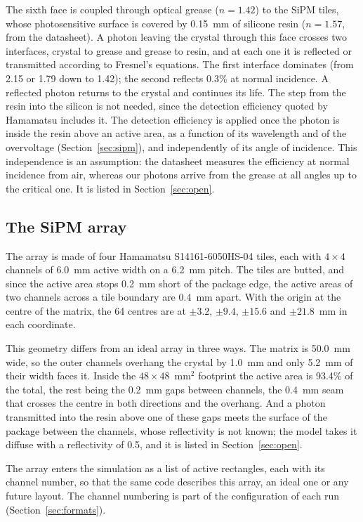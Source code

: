 \documentclass[11pt]{article}
\begin{document}
The sixth face is coupled through optical grease ($n = 1.42$) to the SiPM
tiles, whose photosensitive surface is covered by 0.15~mm of silicone resin
($n = 1.57$, from the datasheet). A photon leaving the crystal through this
face crosses two interfaces, crystal to grease and grease to resin, and at
each one it is reflected or transmitted according to Fresnel's equations. The
first interface dominates (from 2.15 or 1.79 down to 1.42); the second
reflects 0.3\% at normal incidence. A reflected photon returns to the crystal
and continues its life. The step from the resin into the silicon is not
needed, since the detection efficiency quoted by Hamamatsu includes it. The detection efficiency is
applied once the photon is inside the resin above an active area, as a
function of its wavelength and of the overvoltage
(Section~\ref{sec:sipm}), and independently of its angle of incidence. This
independence is an assumption: the datasheet measures the efficiency at
normal incidence from air, whereas our photons arrive from the grease at all
angles up to the critical one. It is listed in Section~\ref{sec:open}.

\subsection{The SiPM array}
\label{sec:layout}

The array is made of four Hamamatsu S14161-6050HS-04 tiles, each with
$4\times4$ channels of 6.0~mm active width on a 6.2~mm pitch. The tiles are
butted, and since the active area stops 0.2~mm short of the package edge, the
active areas of two channels across a tile boundary are 0.4~mm apart. With
the origin at the centre of the matrix, the 64 centres are at $\pm 3.2$,
$\pm 9.4$, $\pm 15.6$ and $\pm 21.8$~mm in each coordinate.

This geometry differs from an ideal array in three ways. The matrix is
50.0~mm wide, so the outer channels overhang the crystal by 1.0~mm and only
5.2~mm of their width faces it. Inside the $48 \times 48$~mm$^2$ footprint
the active area is 93.4\% of the total, the rest being the 0.2~mm gaps
between channels, the 0.4~mm seam that crosses the centre in both directions
and the overhang. And a photon transmitted into the resin above one of these
gaps meets the surface of the package between the channels, whose
reflectivity is not known; the model takes it diffuse with a reflectivity
of 0.5, and it is listed in Section~\ref{sec:open}.

The array enters the simulation as a list of active rectangles, each with
its channel number, so that the same code describes this array, an ideal one
or any future layout. The channel numbering is part of the configuration
of each run (Section~\ref{sec:formats}).
\end{document}
